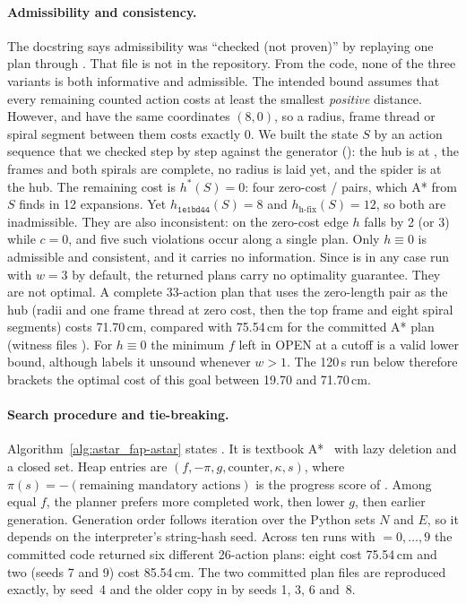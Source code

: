 \paragraph{Admissibility and consistency.}
The docstring says admissibility was ``checked (not proven)'' by replaying one plan through
. That file is not in the repository. From the code, none of the three
variants is both informative and admissible. The intended bound assumes that every remaining
counted action costs at least the smallest \emph{positive} distance. However,
 and  have the same coordinates $(8,0)$, so a
radius, frame thread or spiral segment between them costs exactly 0. We built the state $S$ by an
action sequence that we checked step by step against the generator (): the
hub is at , the frames and both spirals are complete, no radius is laid yet, and
the spider is at the hub. The remaining cost is $h^*(S)=0$: four zero-cost
/ pairs, which A* from $S$ finds in 12 expansions. Yet
$h_{\mathtt{1e1bd44}}(S)=8$ and $h_{\text{h-fix}}(S)=12$, so both are inadmissible. They are also
inconsistent: on the zero-cost edge  $h$
falls by 2 (or 3) while $c=0$, and five such violations occur along a single plan. Only
$h\equiv 0$ is admissible and consistent, and it carries no information. Since 
is in any case run with $w=3$ by default, the returned plans carry no optimality guarantee. They
are not optimal. A complete 33-action plan that uses the zero-length pair as the hub
(radii and one frame thread at zero cost, then the top frame and eight spiral segments) costs
71.70\,cm, compared with 75.54\,cm for the committed A* plan (witness files
). For $h\equiv 0$ the minimum $f$ left in OPEN at a cutoff is a valid lower
bound, although  labels it unsound whenever $w>1$. The 120\,s run below therefore
brackets the optimal cost of this goal between 19.70 and 71.70\,cm.

\paragraph{Search procedure and tie-breaking.}
Algorithm~\ref{alg:astar_fap-astar} states . It is textbook
A*~\cite{ghallab2016automated} with lazy deletion and a closed set. Heap entries are
$(f, -\pi, g, \text{counter}, \kappa, s)$, where $\pi(s)=-(\text{remaining mandatory actions})$ is
the progress score of . Among equal $f$, the planner prefers more completed work,
then lower $g$, then earlier generation. Generation order follows iteration over the Python sets
$N$ and $E$, so it depends on the interpreter's string-hash seed. Across ten runs with
$=0,\dots,9$ the committed code returned six different 26-action plans:
eight cost 75.54\,cm and two (seeds 7 and 9) cost 85.54\,cm. The two committed plan files are
reproduced exactly,  by seed~4 and the older copy in
 by seeds 1, 3, 6 and~8.

